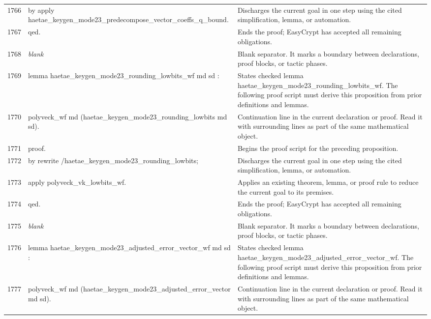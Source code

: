 \documentclass[10pt]{article}
\begin{document}
\begin{longtable}{r L{0.53\textwidth} L{0.37\textwidth}}
1766 & {\ttfamily\scriptsize by apply haetae\_keygen\_mode23\_predecompose\_vector\_coeffs\_q\_bound.} & Discharges the current goal in one step using the cited simplification, lemma, or automation. \\
1767 & {\ttfamily\scriptsize qed.} & Ends the proof; EasyCrypt has accepted all remaining obligations. \\
1768 & {\ttfamily\scriptsize \emph{blank}} & Blank separator.  It marks a boundary between declarations, proof blocks, or tactic phases. \\
1769 & {\ttfamily\scriptsize lemma haetae\_keygen\_mode23\_rounding\_lowbits\_wf md sd :} & States checked lemma haetae\_keygen\_mode23\_rounding\_lowbits\_wf.  The following proof script must derive this proposition from prior definitions and lemmas. \\
1770 & {\ttfamily\scriptsize   polyveck\_wf md (haetae\_keygen\_mode23\_rounding\_lowbits md sd).} & Continuation line in the current declaration or proof.  Read it with surrounding lines as part of the same mathematical object. \\
1771 & {\ttfamily\scriptsize proof.} & Begins the proof script for the preceding proposition. \\
1772 & {\ttfamily\scriptsize by rewrite /haetae\_keygen\_mode23\_rounding\_lowbits;} & Discharges the current goal in one step using the cited simplification, lemma, or automation. \\
1773 & {\ttfamily\scriptsize    apply polyveck\_vk\_lowbits\_wf.} & Applies an existing theorem, lemma, or proof rule to reduce the current goal to its premises. \\
1774 & {\ttfamily\scriptsize qed.} & Ends the proof; EasyCrypt has accepted all remaining obligations. \\
1775 & {\ttfamily\scriptsize \emph{blank}} & Blank separator.  It marks a boundary between declarations, proof blocks, or tactic phases. \\
1776 & {\ttfamily\scriptsize lemma haetae\_keygen\_mode23\_adjusted\_error\_vector\_wf md sd :} & States checked lemma haetae\_keygen\_mode23\_adjusted\_error\_vector\_wf.  The following proof script must derive this proposition from prior definitions and lemmas. \\
1777 & {\ttfamily\scriptsize   polyveck\_wf md (haetae\_keygen\_mode23\_adjusted\_error\_vector md sd).} & Continuation line in the current declaration or proof.  Read it with surrounding lines as part of the same mathematical object. \\

\end{longtable}
\end{document}
